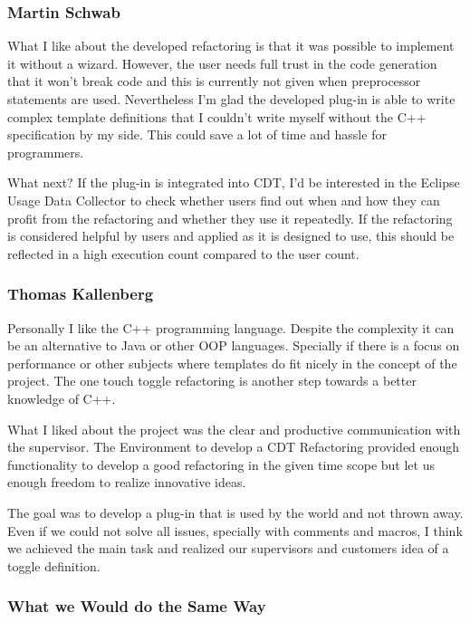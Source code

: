 \subsubsection{Martin Schwab}

What I like about the developed refactoring is that it was possible to
implement 
it without a wizard. However, the user needs full trust in the code generation 
that it won't break code and this is currently not given when preprocessor 
statements are used. Nevertheless I'm glad the developed plug-in is able to
write 
complex template definitions that I couldn't write myself without the C++ 
specification by my side. This could save a lot of time and hassle for 
programmers.

What next? If the plug-in is integrated into CDT, I'd be interested in the 
Eclipse Usage Data Collector \cite{usageData} to check whether users find out 
when and how they can profit from the refactoring and whether they use it 
repeatedly. If the refactoring is considered helpful by users and applied as it 
is designed to use, this should be reflected in a high execution count compared 
to the user count.

\subsubsection{Thomas Kallenberg}

Personally I like the C++ programming language. Despite the complexity it can
be an alternative to Java or other OOP languages. Specially if there is a focus
on performance or other subjects where templates do fit nicely in the concept
of the project.
The one touch toggle refactoring is another step towards a better knowledge of
C++.

What I liked about the project was the clear and productive communication with
the supervisor. The Environment to develop a CDT Refactoring provided enough
functionality to develop a good refactoring in the given time scope but let us
enough freedom to realize innovative ideas.

The goal was to develop a plug-in that is used by the world and not thrown away.
Even if we could not solve all issues, specially with comments and macros, I
think we achieved the main task and realized our supervisors and customers 
idea of a toggle definition.

\subsubsection{What we Would do the Same Way}

